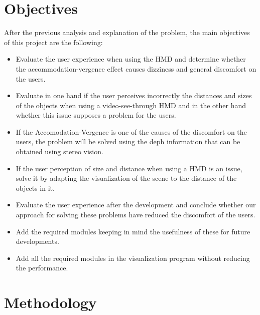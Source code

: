 \documentclass[10pt,a4paper,twocolumn,twoside]{article}
\begin{document}
	\section{Objectives}
	After the previous analysis and explanation of the problem, the main objectives of this project are the following: 

	\begin{itemize}
		\item Evaluate the user experience when using the HMD and determine whether the accommodation-vergence effect causes dizziness and general discomfort on the users. 
		
		\item Evaluate in one hand if the user perceives incorrectly the distances and sizes of the objects when using a video-see-through HMD and in the other hand whether this issue supposes a problem for the users.
		
		\item If the Accomodation-Vergence is one of the causes of the discomfort on the users, the problem will be solved using the deph information that can be obtained using stereo vision. 
		
		\item If the user perception of size and distance when using a HMD is an issue, solve it by adapting the visualization of the scene to the distance of the objects in it.
		
		\item Evaluate the user experience after the development and conclude whether our approach for solving these problems have reduced the discomfort of the users. 
		
		\item Add the required modules keeping in mind the usefulness of these for future developments.
		
		\item Add all the required modules in the visualization program without reducing the performance. 
	\end{itemize}

	\section{Methodology}
	
	
\end{document}
